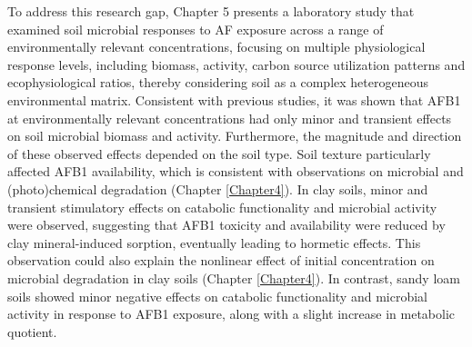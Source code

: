 To address this research gap, Chapter 5 presents a laboratory study that examined soil microbial responses to AF exposure across a range of environmentally relevant concentrations, focusing on multiple physiological response levels, including biomass, activity, carbon source utilization patterns and ecophysiological ratios, thereby considering soil as a complex heterogeneous environmental matrix.  Consistent with previous studies, it was shown 
that AFB1 at environmentally relevant concentrations had only minor and transient effects on soil microbial biomass and activity. Furthermore, the magnitude and direction of these observed effects depended on the soil type. Soil texture particularly affected AFB1 availability, which is consistent with observations on microbial and (photo)chemical degradation (Chapter \ref{Chapter4}). In clay soils, minor and transient stimulatory effects on catabolic functionality and microbial activity were observed, suggesting that AFB1 toxicity and availability were reduced by clay mineral-induced sorption, eventually leading to hormetic effects. This observation could also explain the nonlinear effect of initial concentration on microbial degradation in clay soils (Chapter \ref{Chapter4}). In contrast, sandy loam soils showed minor negative effects on catabolic functionality and microbial activity in response to AFB1 exposure, along with a slight increase in metabolic quotient.


